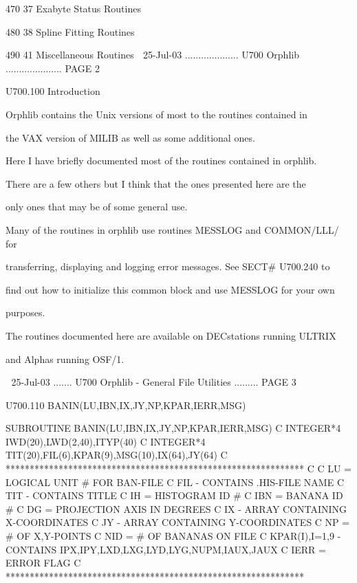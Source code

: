    470  37  Exabyte Status Routines
 
   480  38  Spline Fitting Routines
 
   490  41  Miscellaneous Routines
    
   25-Jul-03 .................... U700  Orphlib ..................... PAGE   2
 
 
 
   U700.100  Introduction
 
 
   Orphlib  contains  the  Unix  versions of most to the routines contained in
 
   the VAX version of MILIB as well as some additional ones.
 
 
   Here I have briefly documented most of the routines contained  in  orphlib.
 
   There  are  a  few  others but I think that the ones presented here are the
 
   only ones that may be of some general use.
 
 
   Many of the routines in orphlib use routines MESSLOG  and  COMMON/LLL/  for
 
   transferring,  displaying and logging error messages. See SECT# U700.240 to
 
   find out how to initialize this common block and use MESSLOG for  your  own
 
   purposes.
 
 
   The  routines  documented  here are available on DECstations running ULTRIX
 
   and Alphas running OSF/1.
 
    
   25-Jul-03 ....... U700  Orphlib - General File Utilities ......... PAGE   3
 
 
   U700.110  BANIN(LU,IBN,IX,JY,NP,KPAR,IERR,MSG)
 
         SUBROUTINE BANIN(LU,IBN,IX,JY,NP,KPAR,IERR,MSG)
   C
         INTEGER*4 IWD(20),LWD(2,40),ITYP(40)
   C
         INTEGER*4 TIT(20),FIL(6),KPAR(9),MSG(10),IX(64),JY(64)
   C     **************************************************************
   C
   C     LU   = LOGICAL UNIT # FOR BAN-FILE
   C     FIL  - CONTAINS .HIS-FILE NAME
   C     TIT  - CONTAINS TITLE
   C     IH   = HISTOGRAM ID #
   C     IBN  = BANANA    ID #
   C     DG   = PROJECTION AXIS IN DEGREES
   C     IX   - ARRAY CONTAINING X-COORDINATES
   C     JY   - ARRAY CONTAINING Y-COORDINATES
   C     NP   = # OF X,Y-POINTS
   C     NID  = # OF BANANAS ON FILE
   C     KPAR(I),I=1,9 - CONTAINS IPX,IPY,LXD,LXG,LYD,LYG,NUPM,IAUX,JAUX
   C     IERR = ERROR FLAG
   C     **************************************************************
 
